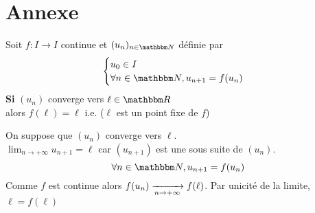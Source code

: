 \part{Annexe}

\begin{prop}
	Soit $f: I \to I$ continue et $(u_n)_{n\in\N}$ définie par \[
	\begin{cases}
		u_0 \in I\\
		\forall n \in \N, u_{n+1} = f(u_n)
	\end{cases}
	\] 
	{\bf Si} $(u_n)$ converge vers $\ell\in \R$\\
	alors  $f(\ell) = \ell$ i.e. ($\ell$ est un point fixe de $f$)
\end{prop}

\begin{prv}
	On suppose que $(u_n)$ converge vers $\ell$.\\
	$\lim_{n\to +\infty} u_{n+1} = \ell$ car $(u_{n+1})$ est une sous suite de $(u_n)$. \[
	\forall n \in \N, u_{n+1} = f(u_n)
	\]
	Comme $f$ est continue alors $f(u_n) \xrightarrow[n\to +\infty]{} f(\ell)$. Par unicité de la limite, $\ell = f(\ell)$
\end{prv}

